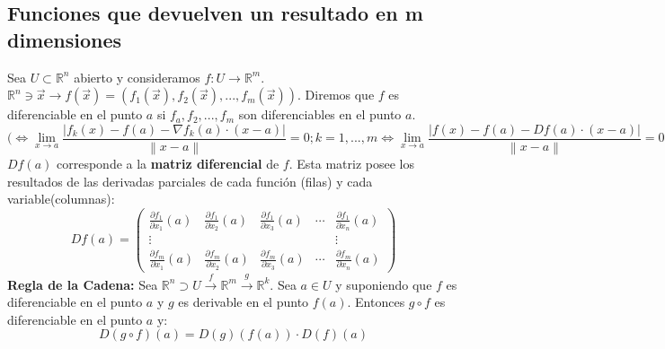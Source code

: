 \documentclass[11pt]{article}
\providecommand{\norm}[1]{\left\lVert #1 \right \rVert}
\providecommand{\abs}[1]{\left\lvert #1\right\rvert}
\providecommand{\norm}[1]{\left\lVert #1 \right \rVert}
\providecommand{\abs}[1]{\left\lvert #1\right\rvert}
\newcommand{\R}{\mathbb{R}}
\theoremstyle{plain}
\begin{document}
        \subsection{Funciones que devuelven un resultado en m dimensiones} %
        \label{sub:funciones_que_devuelven_un_resultado_en_m_dimensiones}
            Sea $U \subset \R^n$ abierto y consideramos $f:U \rightarrow \R^m$. $\R^n \ni \vec{x} \rightarrow f(\vec{x}) = (f_1(\vec{x}),f_2(\vec{x}),...,f_m(\vec{x}))$. Diremos que $f$ es diferenciable en el punto $a$ si $f_a,f_2,...,f_m$ son diferenciables en el punto $a$.
            \[(\Leftrightarrow \lim_{x\to a} \frac{\abs{f_k(x) -f(a) - \nabla f_k(a)\cdot(x-a)}}{\norm{x-a}}=0; k = 1,...,m \Leftrightarrow \lim_{x\to a} \frac{\abs{f(x) -f(a) - Df(a)\cdot(x-a)}}{\norm{x-a}}=0\]
            $Df(a)$ corresponde a la \textbf{matriz diferencial} de $f$. Esta matriz posee los resultados de las derivadas parciales de cada función (filas) y cada variable(columnas):
            \begin{equation}
                Df(a) = 
                \begin{pmatrix}
                    \frac{\partial f_1}{\partial x_1}(a)&\frac{\partial f_1}{\partial x_2}(a)&\frac{\partial f_1}{\partial x_3}(a)&\cdots & \frac{\partial f_1}{\partial x_n}(a)\\
                    \vdots&&&&\vdots\\
                    \frac{\partial f_m}{\partial x_1}(a)&\frac{\partial f_m}{\partial x_2}(a)&\frac{\partial f_m}{\partial x_3}(a)&\cdots & \frac{\partial f_m}{\partial x_n}(a)

                \end{pmatrix}
            \end{equation}
            \textbf{Regla de la Cadena:} Sea $\R^n \supset U \xrightarrow{f} \R^m \xrightarrow{g} \R^k$. Sea $a \in U$ y suponiendo que $f$ es diferenciable en el punto $a$ y $g$ es derivable en el punto $f(a)$. Entonces $g \circ f$ es diferenciable en el punto $a$ y:
            \[D(g\circ f)(a) = D(g)(f(a)) \cdot D(f)(a)\]

\end{document}
